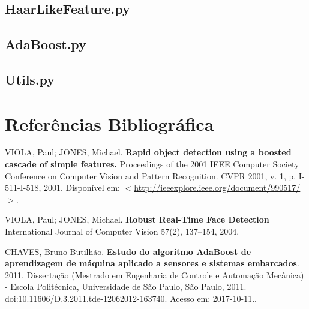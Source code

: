 \documentclass[12pt,a4paper]{article}
\begin{document}
 \subsection{HaarLikeFeature.py}

 

\subsection{AdaBoost.py}


\subsection{Utils.py}






%


\newpage
\section{Referências Bibliográfica}
\noindent VIOLA, Paul; JONES, Michael. \textbf{Rapid object detection using a boosted cascade of simple features.} Proceedings of the 2001 IEEE Computer Society Conference on Computer Vision and Pattern Recognition. CVPR 2001, v. 1, p. I-511-I-518, 2001. Disponível em: $<$\url{http://ieeexplore.ieee.org/document/990517/}$>$.\\\vspace{0.2cm}

\noindent VIOLA, Paul; JONES, Michael. \textbf{Robust Real-Time Face
Detection}  International Journal of Computer Vision
57(2), 137–154, 2004.\\\vspace{0.2cm}


\noindent CHAVES, Bruno Butilhão. \textbf{Estudo do algoritmo AdaBoost de aprendizagem de máquina aplicado a sensores e sistemas embarcados}. 2011. Dissertação (Mestrado em Engenharia de Controle e Automação Mecânica) - Escola Politécnica, Universidade de São Paulo, São Paulo, 2011. doi:10.11606/D.3.2011.tde-12062012-163740. Acesso em: 2017-10-11..\\\vspace{0.2cm}
\end{document}

